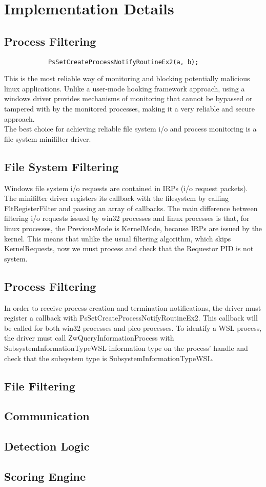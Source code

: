 \chapter{Implementation Details}
    \section{Process Filtering}
        \begin{lstlisting}
            PsSetCreateProcessNotifyRoutineEx2(a, b);
        \end{lstlisting}
            
    This is the most reliable way of monitoring and blocking potentially malicious linux applications. Unlike a user-mode hooking framework
    approach, using a windows driver provides mechanisms of monitoring that cannot be bypassed or tampered with by the monitored processes, making
    it a very reliable and secure approach.\\
    The best choice for achieving reliable file system i/o and process monitoring is a file system minifilter driver.
    
    \section{File System Filtering}
    Windows file system i/o requests are contained in IRPs (i/o request packets). The minifilter driver registers its callback with the
    filesystem by calling FltRegisterFilter and passing an array of callbacks. The main difference between filtering i/o requests issued by win32
    processes and linux processes is that, for linux processes, the PreviousMode is KernelMode, because IRPs are issued by the kernel. This means
    that unlike the usual filtering algorithm, which skips  KernelRequests, now we must process and check that the Requestor PID is not system.

    \section{Process Filtering}
    In order to receive process creation and termination notifications, the driver must register a callback with
    PsSetCreateProcessNotifyRoutineEx2. This callback will be called for both win32 processes and pico processes. To identify a WSL process,
    the driver must call ZwQueryInformationProcess with SubsystemInformationTypeWSL information type on the process' handle and check that the
    subsystem type is SubsystemInformationTypeWSL.
    
    \section{File Filtering}
    \section{Communication}
    \section{Detection Logic}
    \section{Scoring Engine}